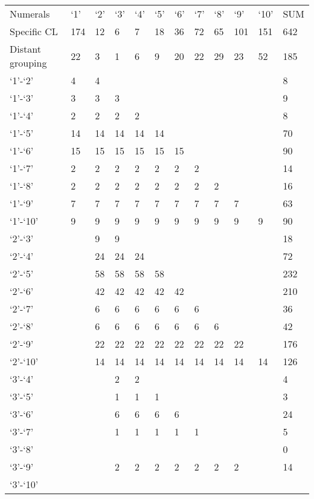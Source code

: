 \begin{table}
\begin{tabularx}{\textwidth}{lXXXXXXXXXXX}
{Numerals} & {‘1’} & {‘2’} & {‘3’} & {‘4’} & {‘5’} & {‘6’} & {‘7’} & {‘8’} & {‘9’} & {‘10’} & {SUM}\\
Specific CL & { 174} & 12 & 6 & 7 & 18 & 36 &{  72} & { 65} & { 101} &{  151} & 642\\
Distant grouping & 22 & 3 & 1 & 6 & 9 & 20 & 22 & 29 & 23 & 52 & 185\\
\midrule
‘1’-‘2’ & 4 & 4 & & ~ & & ~ & & ~ & & ~ & 8\\
‘1’-‘3’ & 3 & 3 & 3 & & ~ & & ~ & & ~ & & 9\\
‘1’-‘4’ & 2 & 2 & 2 & 2 & & ~ & & ~ & & ~ & 8\\
‘1’-‘5’ & 14 & 14 & 14 & 14 & 14 & & ~ & & ~ & & 70\\
‘1’-‘6’ & 15 & 15 & 15 & 15 & 15 & 15 & & ~ & & ~ & 90\\
‘1’-‘7’ & 2 & 2 & 2 & 2 & 2 & 2 & 2 & & ~ & & 14\\
‘1’-‘8’ & 2 & 2 & 2 & 2 & 2 & 2 & 2 & 2 & & ~ & 16\\
‘1’-‘9’ & 7 & 7 & 7 & 7 & 7 & 7 & 7 & 7 & 7 & & 63\\
‘1’-‘10’ & 9 & 9 & 9 & 9 & 9 & 9 & 9 & 9 & 9 & 9 & 90\\
‘2’-‘3’ & & 9 & 9 & & ~ & & ~ & & ~ & & 18\\
‘2’-‘4’ & & 24 & 24 & 24 & & ~ & & ~ & & ~ & 72\\
‘2’-‘5’ & &  58 &  58 &  58 &  58 & & ~ & & ~ & & 232\\
‘2’-‘6’ & &  42 &  42 &  42 &  42 &  42 & & ~ & & ~ & 210\\
‘2’-‘7’ & & 6 & 6 & 6 & 6 & 6 & 6 & & ~ & & 36\\
‘2’-‘8’ & & 6 & 6 & 6 & 6 & 6 & 6 & 6 & & ~ & 42\\
‘2’-‘9’ & & 22 & 22 & 22 & 22 & 22 & 22 & 22 & 22 & & 176\\
‘2’-‘10’ & & 14 & 14 & 14 & 14 & 14 & 14 & 14 & 14 & 14 & 126\\
‘3’-‘4’ & & ~ & 2 & 2 & & ~ & & ~ & & ~ & 4\\
‘3’-‘5’ & & ~ & 1 & 1 & 1 & & ~ & & ~ & & 3\\
‘3’-‘6’ & & ~ & 6 & 6 & 6 & 6 & & ~ & & ~ & 24\\
‘3’-‘7’ & & ~ & 1 & 1 & 1 & 1 & 1 & & ~ & & 5\\
‘3’-‘8’ & & ~ & & ~ & & ~ & & ~ & & ~ & 0\\
‘3’-‘9’ & & ~ & 2 & 2 & 2 & 2 & 2 & 2 & 2 & & 14\\
‘3’-‘10’ & & ~ & & ~ & & ~ & & ~ & & ~ & ~\\
\midrule
\end{tabularx}
\end{table}
